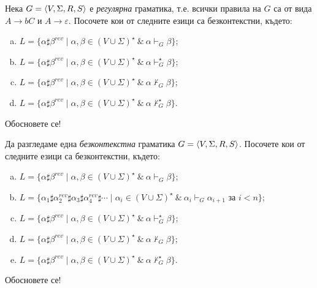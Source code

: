 \begin{problem}
  Нека $G = \langle{V,\Sigma,R,S}\rangle$ е {\em регулярна} граматика, т.е.
  всички правила на $G$ са от вида $A \to bC$ и $A \to \varepsilon$.
  Посочете кои от следните езици са безконтекстни, където:
  \begin{enumerate}[a)]
  \item 
    $L = \{\alpha\sharp\beta^{rev} \mid \alpha,\beta \in (V \cup \Sigma)^\star\ \&\ \alpha \vdash_G \beta\}$;
  \item 
    $L = \{\alpha\sharp\beta^{rev} \mid \alpha,\beta \in (V \cup \Sigma)^\star\ \&\ \alpha \vdash^\star_G \beta\}$;
  \item
    $L = \{\alpha\sharp\beta^{rev} \mid \alpha,\beta \in (V \cup \Sigma)^\star\ \&\ \alpha \not\vdash_G \beta\}$;
  \item
    $L = \{\alpha\sharp\beta^{rev} \mid \alpha,\beta \in (V \cup \Sigma)^\star\ \&\ \alpha \not\vdash^\star_G \beta\}$.
  \end{enumerate}
  Обосновете се!
\end{problem}

\begin{problem}
  Да разгледаме една {\em безконтекстна} граматика $G = \langle{V,\Sigma,R,S}\rangle$.
  Посочете кои от следните езици са безконтекстни, където:
  \begin{enumerate}[a)]
  \item 
    $L = \{\alpha\sharp\beta^{rev} \mid \alpha,\beta \in (V \cup \Sigma)^\star\ \&\ \alpha \vdash_G \beta\}$;
  \item
    $L = \{\alpha_1\sharp\alpha^{rev}_2\sharp\alpha_3\sharp\alpha^{rev}_4\sharp \cdots \mid \alpha_i \in (V \cup \Sigma)^\star\ \&\ \alpha_i \vdash_G \alpha_{i+1} \text{ за }i<n\}$;
  \item 
    $L = \{\alpha\sharp\beta^{rev} \mid \alpha,\beta \in (V \cup \Sigma)^\star\ \&\ \alpha \vdash^\star_G \beta\}$;
  \item
    $L = \{\alpha\sharp\beta^{rev} \mid \alpha,\beta \in (V \cup \Sigma)^\star\ \&\ \alpha \not\vdash_G \beta\}$;
  \item
    $L = \{\alpha\sharp\beta^{rev} \mid \alpha,\beta \in (V \cup \Sigma)^\star\ \&\ \alpha \not\vdash^\star_G \beta\}$.
  \end{enumerate}
  Обосновете се!
\end{problem}

